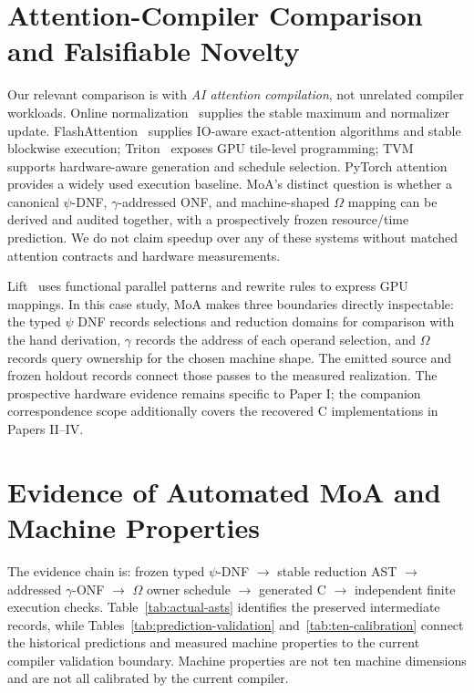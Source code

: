\documentclass[sigplan,10pt,review,balance=false,pbalance=false]{acmart}
\begin{document}
\section{Attention-Compiler Comparison and Falsifiable Novelty}
\label{sec:fair-comparison}
Our relevant comparison is with \emph{AI attention compilation}, not unrelated compiler workloads. Online normalization~\cite{online} supplies the stable maximum and normalizer update. FlashAttention~\cite{flash,flash2} supplies IO-aware exact-attention algorithms and stable blockwise execution; Triton~\cite{triton} exposes GPU tile-level programming; TVM~\cite{tvm} supports hardware-aware generation and schedule selection. PyTorch attention provides a widely used execution baseline. MoA's distinct question is whether a canonical $\psi$-DNF, $\gamma$-addressed ONF, and machine-shaped $\Omega$ mapping can be derived and audited together, with a prospectively frozen resource/time prediction. We do not claim speedup over any of these systems without matched attention contracts and hardware measurements.

Lift~\cite{lift} uses functional parallel patterns and rewrite rules to express GPU mappings. In this case study, MoA makes three boundaries directly inspectable: the typed $\psi$ DNF records selections and reduction domains for comparison with the hand derivation, $\gamma$ records the address of each operand selection, and $\Omega$ records query ownership for the chosen machine shape. The emitted source and frozen holdout records connect those passes to the measured realization. The prospective hardware evidence remains specific to Paper I; the companion correspondence scope additionally covers the recovered C implementations in Papers II--IV.

\section{Evidence of Automated MoA and Machine Properties}
\label{sec:evidence-matrix}
The evidence chain is: frozen typed $\psi$-DNF $\rightarrow$ stable reduction AST $\rightarrow$ addressed $\gamma$-ONF $\rightarrow$ $\Omega$ owner schedule $\rightarrow$ generated C $\rightarrow$ independent finite execution checks. Table~\ref{tab:actual-asts} identifies the preserved intermediate records, while Tables~\ref{tab:prediction-validation} and~\ref{tab:ten-calibration} connect the historical predictions and measured machine properties to the current compiler validation boundary. Machine properties are not ten machine dimensions and are not all calibrated by the current compiler.
\end{document}
